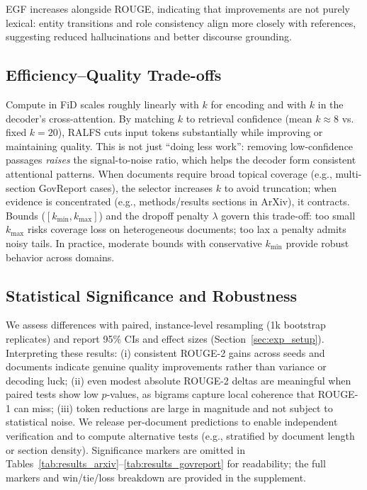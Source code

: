 \documentclass[11pt,a4paper]{article}
\begin{document}
EGF increases alongside ROUGE, indicating that improvements are not purely lexical: entity transitions and role consistency align more closely with references, suggesting reduced hallucinations and better discourse grounding.

\subsection{Efficiency--Quality Trade-offs}

Compute in FiD scales roughly linearly with $k$ for encoding and with $k$ in the decoder’s cross-attention. By matching $k$ to retrieval confidence (mean $k\!\approx\!8$ vs. fixed $k\!=\!20$), RALFS cuts input tokens substantially while improving or maintaining quality. This is not just ``doing less work'': removing low-confidence passages \emph{raises} the signal-to-noise ratio, which helps the decoder form consistent attentional patterns. When documents require broad topical coverage (e.g., multi-section GovReport cases), the selector increases $k$ to avoid truncation; when evidence is concentrated (e.g., methods/results sections in ArXiv), it contracts. Bounds ($[k_{\min},k_{\max}]$) and the dropoff penalty $\lambda$ govern this trade-off: too small $k_{\max}$ risks coverage loss on heterogeneous documents; too lax a penalty admits noisy tails. In practice, moderate bounds with conservative $k_{\min}$ provide robust behavior across domains.

\subsection{Statistical Significance and Robustness}

We assess differences with paired, instance-level resampling (1k bootstrap replicates) and report 95\% CIs and effect sizes (Section~\ref{sec:exp_setup}). Interpreting these results: (i) consistent ROUGE-2 gains across seeds and documents indicate genuine quality improvements rather than variance or decoding luck; (ii) even modest absolute ROUGE-2 deltas are meaningful when paired tests show low $p$-values, as bigrams capture local coherence that ROUGE-1 can miss; (iii) token reductions are large in magnitude and not subject to statistical noise. We release per-document predictions to enable independent verification and to compute alternative tests (e.g., stratified by document length or section density). Significance markers are omitted in Tables~\ref{tab:results_arxiv}--\ref{tab:results_govreport} for readability; the full markers and win/tie/loss breakdown are provided in the supplement.
\end{document}
